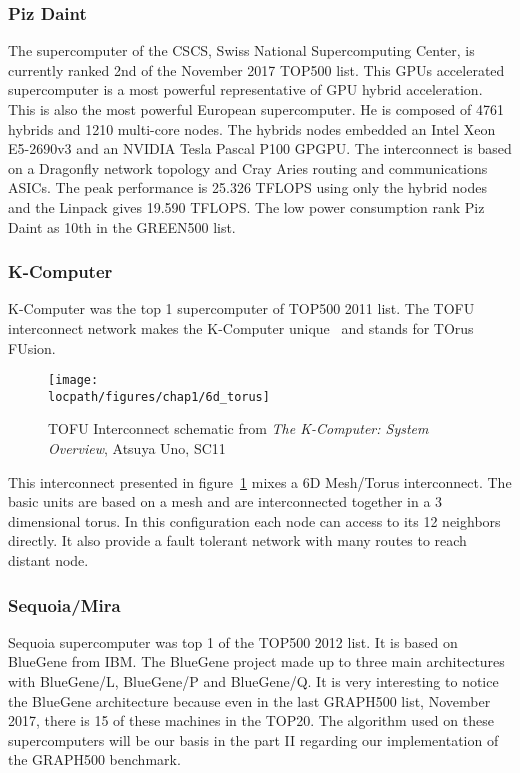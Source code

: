 \subsubsection{Piz Daint}
The supercomputer of the CSCS, Swiss National Supercomputing Center, is currently ranked 2nd of the November 2017 TOP500 list. 
This GPUs accelerated supercomputer is a most powerful representative of GPU hybrid acceleration.
This is also the most powerful European supercomputer. 
He is composed of 4761 hybrids and 1210 multi-core nodes. 
The hybrids nodes embedded an Intel Xeon E5-2690v3 and an NVIDIA Tesla Pascal P100 GPGPU. 
The interconnect is based on a Dragonfly network topology and Cray Aries routing and communications ASICs. 
The peak performance is 25.326 TFLOPS using only the hybrid nodes and the Linpack gives 19.590 TFLOPS.
The low power consumption rank Piz Daint as 10th in the GREEN500 list. 

\subsubsection{K-Computer}
K-Computer was the top 1 supercomputer of TOP500 2011 list. 
The TOFU interconnect network makes the K-Computer unique~\cite{ajima2009tofu} and stands for TOrus FUsion.
\begin{figure}[t!]
\begin{center}
\texttt{[image: \\locpath/figures/chap1/6d\_torus]}
\end{center}
\caption{TOFU Interconnect schematic from \textit{The K-Computer: System Overview}, Atsuya Uno, SC11}
\label{fig:1_HPC:tofu}
\end{figure}
This interconnect presented in figure~\ref{fig:1_HPC:tofu} mixes a 6D Mesh/Torus interconnect.
The basic units are based on a mesh and are interconnected together in a 3 dimensional torus. 
In this configuration each node can access to its 12 neighbors directly. 
It also provide a fault tolerant network with many routes to reach distant node. 

\subsubsection{Sequoia/Mira}
Sequoia supercomputer was top 1 of the TOP500 2012 list. 
It is based on BlueGene from IBM.
The BlueGene project made up to three main architectures with BlueGene/L, BlueGene/P and BlueGene/Q.
It is very interesting to notice the BlueGene architecture because even in the last GRAPH500 list, November 2017, there is 15 of these machines in the TOP20.
The algorithm used on these supercomputers will be our basis in the part II regarding our implementation of the GRAPH500 benchmark.

